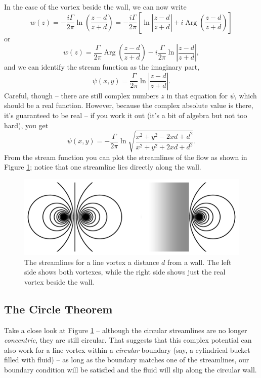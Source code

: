 In the case of the vortex beside the wall, we can now write
\[
w(z) = -\frac{i\Gamma}{2\pi} \ln \left( \frac{z - d}{z+d} \right) = -\frac{i\Gamma}{2\pi} \left[ \ln \left| \frac{z-d}{z+d} \right| + i \operatorname{Arg} \left( \frac{z-d}{z+d} \right) \right]
\]
or
\[
w(z) = \frac{\Gamma}{2\pi}\operatorname{Arg} \left( \frac{z-d}{z+d} \right) - i \frac{\Gamma}{2\pi} \ln \left| \frac{z - d}{z+d} \right|,
\]
and we can identify the stream function as the imaginary part,
\begin{equation}
\psi(x, y) = \frac{\Gamma}{2\pi} \ln \left| \frac{z - d}{z+d} \right|.
\end{equation}
Careful, though -- there are still complex numbers $z$ in that equation for $\psi$, which should be a real function.  However, because the complex absolute value is there, it's guaranteed to be real -- if you work it out (it's a bit of algebra but not too hard), you get
\begin{equation}
\psi(x, y) = -\frac{\Gamma}{2\pi} \ln \sqrt{ \frac{x^2 + y^2 - 2xd + d^2}{x^2 + y^2 + 2xd + d^2} }.
\end{equation}
From the stream function you can plot the streamlines of the flow as shown in Figure \ref{fig_vortex_wall}; notice that one streamline lies directly along the wall.

\begin{figure}
\centering\includegraphics[width=0.9\linewidth]{Figures/Chapter4/fig_vortex_wall}
\caption{The streamlines for a line vortex a distance $d$ from a wall.  The left side shows both vortexes, while the right side shows just the real vortex beside the wall.}
\label{fig_vortex_wall}
\end{figure}



\subsection{The Circle Theorem}

Take a close look at Figure \ref{fig_vortex_wall} -- although the circular streamlines are no longer \emph{concentric}, they are still circular.  That suggests that this complex potential can also work for a line vortex within a \emph{circular} boundary (say, a cylindrical bucket filled with fluid) -- as long as the boundary matches one of the streamlines, our boundary condition will be satisfied and the fluid will slip along the circular wall.

